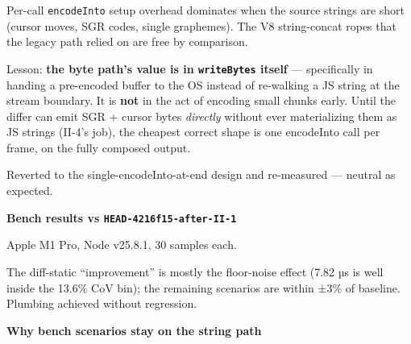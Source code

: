 Per-call \texttt{e\allowbreak{}n\allowbreak{}c\allowbreak{}o\allowbreak{}d\allowbreak{}e\allowbreak{}I\allowbreak{}n\allowbreak{}t\allowbreak{}o} setup overhead dominates when the source strings are short (cursor moves, SGR codes, single graphemes). The V8 string-concat ropes that the legacy path relied on are free by comparison.

Lesson: \textbf{the byte path's value is in \texttt{w\allowbreak{}r\allowbreak{}i\allowbreak{}t\allowbreak{}e\allowbreak{}B\allowbreak{}y\allowbreak{}t\allowbreak{}e\allowbreak{}s} itself} --- specifically in handing a pre-encoded buffer to the OS instead of re-walking a JS string at the stream boundary. It is \textbf{not} in the act of encoding small chunks early. Until the differ can emit SGR + cursor bytes \emph{directly} without ever materializing them as JS strings (II-4's job), the cheapest correct shape is one encodeInto call per frame, on the fully composed output.

Reverted to the single-encodeInto-at-end design and re-measured --- neutral as expected.

\textbf{Bench results vs \texttt{H\allowbreak{}E\allowbreak{}A\allowbreak{}D\allowbreak{}-\allowbreak{}4\allowbreak{}2\allowbreak{}1\allowbreak{}6\allowbreak{}f\allowbreak{}1\allowbreak{}5\allowbreak{}-\allowbreak{}a\allowbreak{}f\allowbreak{}t\allowbreak{}e\allowbreak{}r\allowbreak{}-\allowbreak{}I\allowbreak{}I\allowbreak{}-\allowbreak{}1}}

Apple M1 Pro, Node v25.8.1, 30 samples each.



The diff-static ``improvement'' is mostly the floor-noise effect (7.82 µs is well inside the 13.6\% CoV bin); the remaining scenarios are within ±3\% of baseline. Plumbing achieved without regression.

\textbf{Why bench scenarios stay on the string path}

